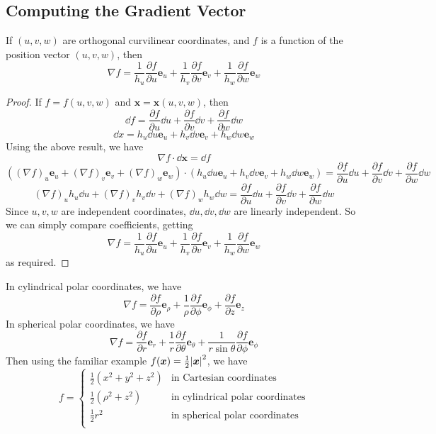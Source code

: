 \documentclass{article}
\begin{document}
\subsection{Computing the Gradient Vector}
\begin{proposition}
    If $(u, v, w)$ are orthogonal curvilinear coordinates, and $f$ is a function of the position vector $(u, v, w)$, then
    \[ \nabla f = \frac{1}{h_u}\frac{\partial f}{\partial u}\bm e_u + \frac{1}{h_v}\frac{\partial f}{\partial v}\bm e_v + \frac{1}{h_w}\frac{\partial f}{\partial w}\bm e_w \]
\end{proposition}
\begin{proof}
    If $f = f(u, v, w)$ and $\bm x = \bm x(u, v, w)$, then
    \[ \dd f = \frac{\partial f}{\partial u}\dd u + \frac{\partial f}{\partial v}\dd v + \frac{\partial f}{\partial w}\dd w \]
    \[ \dd x = h_u \dd u \bm e_u + h_v \dd v \bm e_v + h_w \dd w \bm e_w \]
    Using the above result, we have
    \[ \nabla f \cdot \dd \bm x = \dd f \]
    \[ \left( (\nabla f)_u \bm e_u + (\nabla f)_v \bm e_v + (\nabla f)_w \bm e_w \right) \cdot \left( h_u \dd u \bm e_u + h_v \dd v \bm e_v + h_w \dd w \bm e_w \right) = \frac{\partial f}{\partial u}\dd u + \frac{\partial f}{\partial v}\dd v + \frac{\partial f}{\partial w}\dd w \]
    \[  (\nabla f)_u h_u \dd u + (\nabla f)_v h_v \dd v + (\nabla f)_w h_w \dd w = \frac{\partial f}{\partial u}\dd u + \frac{\partial f}{\partial v}\dd v + \frac{\partial f}{\partial w}\dd w \]
    Since $u, v, w$ are independent coordinates, $\dd u, \dd v, \dd w$ are linearly independent. So we can simply compare coefficients, getting
    \[ \nabla f = \frac{1}{h_u}\frac{\partial f}{\partial u}\bm e_u + \frac{1}{h_v}\frac{\partial f}{\partial v}\bm e_v + \frac{1}{h_w}\frac{\partial f}{\partial w}\bm e_w \]
    as required.
\end{proof}
\noindent In cylindrical polar coordinates, we have
\[ \nabla f = \frac{\partial f}{\partial \rho} \bm e_\rho + \frac{1}{\rho} \frac{\partial f}{\partial \phi} \bm e_\phi + \frac{\partial f}{\partial z} \bm e_z \]
In spherical polar coordinates, we have
\[ \nabla f = \frac{\partial f}{\partial r} \bm e_r + \frac{1}{r} \frac{\partial f}{\partial \theta} \bm e_\theta + \frac{1}{r\sin\theta} \frac{\partial f}{\partial \phi} \bm e_\phi \]
Then using the familiar example $f(\bm x) = \frac{1}{2}\abs{\bm x}^2$, we have
\[
    f = \begin{cases}
        \frac{1}{2}(x^2 + y^2 + z^2) & \text{in Cartesian coordinates}         \\
        \frac{1}{2}(\rho^2 + z^2)    & \text{in cylindrical polar coordinates} \\
        \frac{1}{2}r^2               & \text{in spherical polar coordinates}   \\
    \end{cases}
\]
\end{document}
